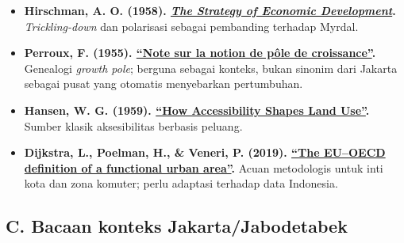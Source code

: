\documentclass[
  indonesian,
  11pt,
  a4paper,
  oneside,
  openany]{report}
\begin{document}
\begin{itemize}
{  (2012). \href{https://doi.org/10.1007/s00168-011-0496-7}{``Central
  place theory and its reemergence in regional science''}.} Jembatan
  dari teori tempat sentral klasik ke ilmu regional kontemporer.
\item
  \textbf{Hirschman, A. O. (1958).
  \href{https://books.google.com/books/about/The_Strategy_of_Economic_Development.html?id=wls-AAAAYAAJ}{\emph{The
  Strategy of Economic Development}}.} \emph{Trickling-down} dan
  polarisasi sebagai pembanding terhadap Myrdal.
\item
  \textbf{Perroux, F. (1955).
  \href{https://doi.org/10.3406/ecoap.1955.2522}{``Note sur la notion de
  pôle de croissance''}.} Genealogi \emph{growth pole}; berguna sebagai
  konteks, bukan sinonim dari Jakarta sebagai pusat yang otomatis
  menyebarkan pertumbuhan.
\item
  \textbf{Hansen, W. G. (1959).
  \href{https://doi.org/10.1080/01944365908978307}{``How Accessibility
  Shapes Land Use''}.} Sumber klasik aksesibilitas berbasis peluang.
\item
  \textbf{Dijkstra, L., Poelman, H., \& Veneri, P. (2019).
  \href{https://doi.org/10.1787/d58cb34d-en}{``The EU--OECD definition
  of a functional urban area''}.} Acuan metodologis untuk inti kota dan
  zona komuter; perlu adaptasi terhadap data Indonesia.
\end{itemize}

\subsection{C. Bacaan konteks
Jakarta/Jabodetabek}\label{c.-bacaan-konteks-jakartajabodetabek}
\end{document}
